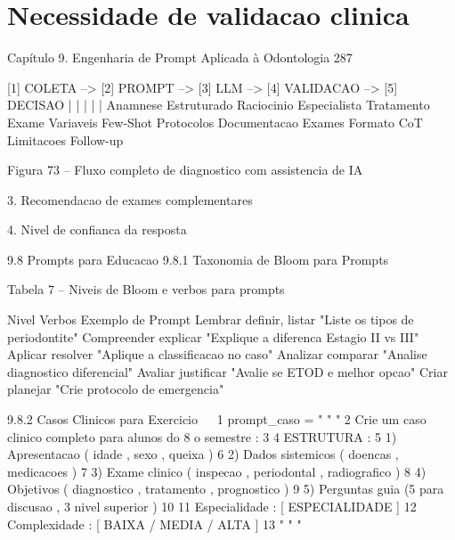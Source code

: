 \chapter{Necessidade de validacao clinica}

Capítulo 9. Engenharia de Prompt Aplicada à Odontologia                                   287

  [1] COLETA --\textgreater{} [2] PROMPT --\textgreater{} [3] LLM --\textgreater{} [4] VALIDACAO --\textgreater{} [5] DECISAO
    |              |              |              |              |
  Anamnese    Estruturado    Raciocinio    Especialista    Tratamento
  Exame       Variaveis      Few-Shot      Protocolos      Documentacao
  Exames      Formato        CoT           Limitacoes      Follow-up

             Figura 73 – Fluxo completo de diagnostico com assistencia de IA

        3. Recomendacao de exames complementares

        4. Nivel de confianca da resposta

  9.8     Prompts para Educacao
  9.8.1    Taxonomia de Bloom para Prompts

                       Tabela 7 – Niveis de Bloom e verbos para prompts

               Nivel           Verbos            Exemplo de Prompt
               Lembrar         definir, listar   "Liste os tipos de periodontite"
               Compreender     explicar          "Explique a diferenca Estagio II vs III"
               Aplicar         resolver          "Aplique a classificacao no caso"
               Analizar        comparar          "Analise diagnostico diferencial"
               Avaliar         justificar        "Avalie se ETOD e melhor opcao"
               Criar           planejar          "Crie protocolo de emergencia"

  9.8.2    Casos Clinicos para Exercicio
                                                                                                 
 1 prompt\_caso = " " "
 2 Crie um caso clinico completo para alunos do 8 o semestre :
 3
 4 ESTRUTURA :
 5 1) Apresentacao ( idade , sexo , queixa )
 6 2) Dados sistemicos ( doencas , medicacoes )
 7 3) Exame clinico ( inspecao , periodontal , radiografico )
 8 4) Objetivos ( diagnostico , tratamento , prognostico )
 9 5) Perguntas guia (5 para discusao , 3 nivel superior )
10
11 Especialidade : [ ESPECIALIDADE ]
12 Complexidade : [ BAIXA / MEDIA / ALTA ]
13 " " "
 


